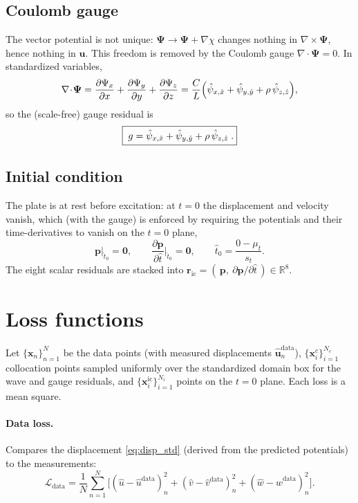 \documentclass[11pt]{article}
\newcommand{\xh}{\hat{x}} \newcommand{\yh}{\hat{y}} \newcommand{\zh}{\hat{z}}
\newcommand{\tht}{\hat{t}}
\newcommand{\uh}{\hat{u}} \newcommand{\vh}{\hat{v}} \newcommand{\wh}{\hat{w}}
\newcommand{\dd}[2]{\frac{\partial #1}{\partial #2}}
\begin{document}
\subsection{Coulomb gauge}
The vector potential is not unique: $\boldsymbol{\Psi}\!\to\!\boldsymbol{\Psi}+\nabla\chi$
changes nothing in $\nabla\times\boldsymbol{\Psi}$, hence nothing in $\mathbf u$.
This freedom is removed by the Coulomb gauge $\nabla\!\cdot\!\boldsymbol{\Psi}=0$.
In standardized variables,
\begin{equation}
\nabla\!\cdot\!\boldsymbol{\Psi}
=\dd{\Psi_x}{x}+\dd{\Psi_y}{y}+\dd{\Psi_z}{z}
=\frac{C}{L}\Big(\psih_{x,\xh}+\psih_{y,\yh}+\rho\,\psih_{z,\zh}\Big),
\end{equation}
so the (scale-free) gauge residual is
\begin{equation}
\boxed{\;g=\psih_{x,\xh}+\psih_{y,\yh}+\rho\,\psih_{z,\zh}\;.}
\label{eq:gauge}
\end{equation}

\subsection{Initial condition}
The plate is at rest before excitation: at $t=0$ the displacement and velocity
vanish, which (with the gauge) is enforced by requiring the potentials and their
time-derivatives to vanish on the $t=0$ plane,
\begin{equation}
\mathbf{p}\big|_{\tht_0}=\mathbf 0,\qquad
\dd{\mathbf{p}}{\tht}\Big|_{\tht_0}=\mathbf 0,\qquad
\tht_0=\frac{0-\mu_t}{s_t}.
\label{eq:ic}
\end{equation}
The eight scalar residuals are stacked into
$\mathbf{r}_{\mathrm{ic}}=(\,\mathbf{p},\ \partial\mathbf{p}/\partial\tht\,)\in\mathbb{R}^{8}$.

\section{Loss functions}
\label{sec:loss}
Let $\{\mathbf{x}_n\}_{n=1}^{N}$ be the data points (with measured displacements
$\hat{\mathbf u}^{\mathrm{data}}_n$), $\{\mathbf{x}^c_i\}_{i=1}^{N_c}$ collocation
points sampled uniformly over the standardized domain box for the wave and gauge
residuals, and $\{\mathbf{x}^{\mathrm{ic}}_i\}_{i=1}^{N_i}$ points on the $t=0$
plane. Each loss is a mean square.

\paragraph{Data loss.} Compares the displacement \eqref{eq:disp_std} (derived from
the predicted potentials) to the measurements:
\begin{equation}
\mathcal{L}_{\mathrm{data}}=\frac{1}{N}\sum_{n=1}^{N}
\Big[(\uh-\uh^{\mathrm{data}})_n^2+(\vh-\vh^{\mathrm{data}})_n^2+(\wh-\wh^{\mathrm{data}})_n^2\Big].
\end{equation}
\end{document}
